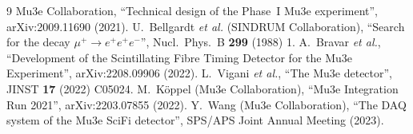 \documentclass[10.5pt,a4paper]{article}
\begin{document}
\begin{thebibliography}{9}\small\sffamily
{} Mu3e Collaboration, ``Technical design of the Phase~I Mu3e experiment'', arXiv:2009.11690 (2021).
 U.~Bellgardt \textit{et al.} (SINDRUM Collaboration), ``Search for the decay $\mu^+\to e^+e^+e^-$'', Nucl.\ Phys.\ B \textbf{299} (1988) 1.
 A.~Bravar \textit{et al.}, ``Development of the Scintillating Fibre Timing Detector for the Mu3e Experiment'', arXiv:2208.09906 (2022).
 L.~Vigani \textit{et al.}, ``The Mu3e detector'', JINST \textbf{17} (2022) C05024.
 M.~K\"oppel (Mu3e Collaboration), ``Mu3e Integration Run 2021'', arXiv:2203.07855 (2022).
 Y.~Wang (Mu3e Collaboration), ``The DAQ system of the Mu3e SciFi detector'', SPS/APS Joint Annual Meeting (2023).
\end{thebibliography}
\end{document}
